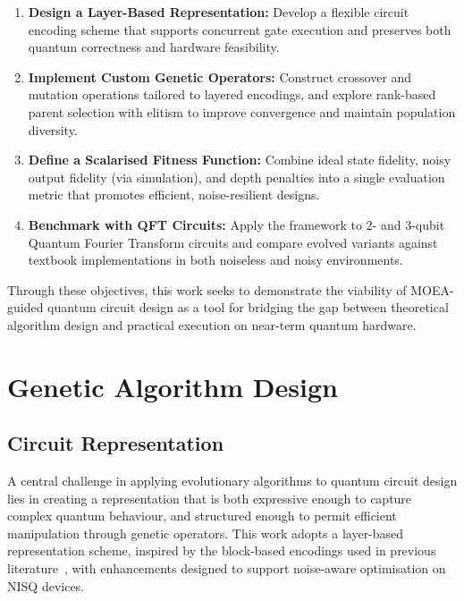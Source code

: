 \documentclass[11pt,a4paper]{article}
\begin{document}
\begin{enumerate}
    \item \textbf{Design a Layer-Based Representation:} Develop a flexible circuit encoding scheme that supports concurrent gate execution and preserves both quantum correctness and hardware feasibility.
    \item \textbf{Implement Custom Genetic Operators:} Construct crossover and mutation operations tailored to layered encodings, and explore rank-based parent selection with elitism to improve convergence and maintain population diversity.
    \item \textbf{Define a Scalarised Fitness Function:} Combine ideal state fidelity, noisy output fidelity (via simulation), and depth penalties into a single evaluation metric that promotes efficient, noise-resilient designs.
    \item \textbf{Benchmark with QFT Circuits:} Apply the framework to 2- and 3-qubit Quantum Fourier Transform circuits and compare evolved variants against textbook implementations in both noiseless and noisy environments.
\end{enumerate}

Through these objectives, this work seeks to demonstrate the viability of MOEA-guided quantum circuit design as a tool for bridging the gap between theoretical algorithm design and practical execution on near-term quantum hardware.

%
%
\section{Genetic Algorithm Design}
\subsection{Circuit Representation}
A central challenge in applying evolutionary algorithms to quantum circuit design lies in creating a representation that is both expressive enough to capture complex quantum behaviour, and structured enough to permit efficient manipulation through genetic operators. This work adopts a layer-based representation scheme, inspired by the block-based encodings used in previous literature~\cite{Lukac2002EvolvingQC}, with enhancements designed to support noise-aware optimisation on NISQ devices.\newline
\end{document}
